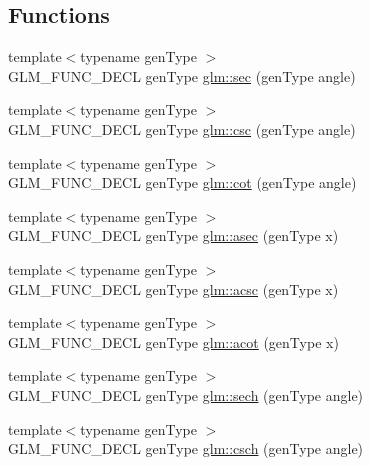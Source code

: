 \subsection*{Functions}
\begin{DoxyCompactItemize}
\item 
{\footnotesize template$<$typename gen\+Type $>$ }\\G\+L\+M\+\_\+\+F\+U\+N\+C\+\_\+\+D\+E\+CL gen\+Type \hyperlink{group__gtc__reciprocal_gae4bcbebee670c5ea155f0777b3acbd84}{glm\+::sec} (gen\+Type angle)
\item 
{\footnotesize template$<$typename gen\+Type $>$ }\\G\+L\+M\+\_\+\+F\+U\+N\+C\+\_\+\+D\+E\+CL gen\+Type \hyperlink{group__gtc__reciprocal_ga59dd0005b6474eea48af743b4f14ebbb}{glm\+::csc} (gen\+Type angle)
\item 
{\footnotesize template$<$typename gen\+Type $>$ }\\G\+L\+M\+\_\+\+F\+U\+N\+C\+\_\+\+D\+E\+CL gen\+Type \hyperlink{group__gtc__reciprocal_ga3a7b517a95bbd3ad74da3aea87a66314}{glm\+::cot} (gen\+Type angle)
\item 
{\footnotesize template$<$typename gen\+Type $>$ }\\G\+L\+M\+\_\+\+F\+U\+N\+C\+\_\+\+D\+E\+CL gen\+Type \hyperlink{group__gtc__reciprocal_ga2c5b7f962c2c9ff684e6d2de48db1f10}{glm\+::asec} (gen\+Type x)
\item 
{\footnotesize template$<$typename gen\+Type $>$ }\\G\+L\+M\+\_\+\+F\+U\+N\+C\+\_\+\+D\+E\+CL gen\+Type \hyperlink{group__gtc__reciprocal_ga1b4bed91476b9b915e76b4a30236d330}{glm\+::acsc} (gen\+Type x)
\item 
{\footnotesize template$<$typename gen\+Type $>$ }\\G\+L\+M\+\_\+\+F\+U\+N\+C\+\_\+\+D\+E\+CL gen\+Type \hyperlink{group__gtc__reciprocal_gaeadfb9c9d71093f7865b2ba2ca8d104d}{glm\+::acot} (gen\+Type x)
\item 
{\footnotesize template$<$typename gen\+Type $>$ }\\G\+L\+M\+\_\+\+F\+U\+N\+C\+\_\+\+D\+E\+CL gen\+Type \hyperlink{group__gtc__reciprocal_ga9a5cfd1e7170104a7b33863b1b75e5ae}{glm\+::sech} (gen\+Type angle)
\item 
{\footnotesize template$<$typename gen\+Type $>$ }\\G\+L\+M\+\_\+\+F\+U\+N\+C\+\_\+\+D\+E\+CL gen\+Type \hyperlink{group__gtc__reciprocal_ga6d95843ff3ca6472ab399ba171d290a0}{glm\+::csch} (gen\+Type angle)
\item 

\end{DoxyCompactItemize}
